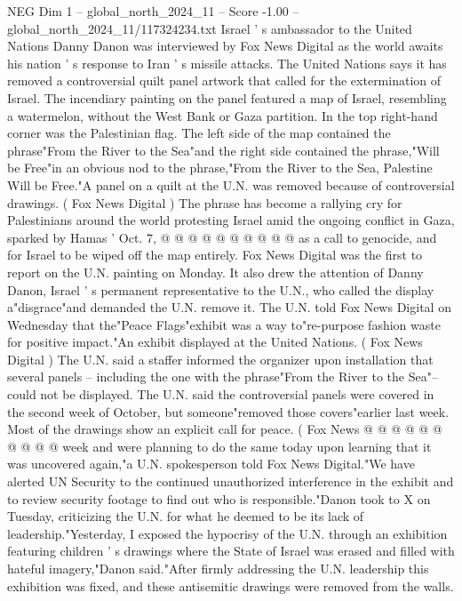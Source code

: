 \begin{textsample}{NEG Dim 1 – global\_north\_2024\_11 – Score -1.00 – global\_north\_2024\_11/117324234.txt}  \label{ex:f1_neg_110}
Israel ' s ambassador to the United Nations Danny Danon was interviewed by Fox News Digital as the world awaits his nation ' s response to Iran ' s missile attacks.
The United Nations says it has removed a controversial quilt panel artwork that called for the extermination of Israel.
The incendiary painting on the panel featured a map of Israel, resembling a watermelon, without the West Bank or Gaza partition.
In the top right-hand corner was the Palestinian flag.
The left side of the map contained the phrase"From the River to the Sea"and the right side contained the phrase,"Will be Free"in an obvious nod to the phrase,"From the River to the Sea, Palestine Will be Free."A panel on a quilt at the U.N. was removed because of controversial drawings. ( Fox News Digital ) The phrase has become a rallying cry for Palestinians around the world protesting Israel amid the ongoing conflict in Gaza, sparked by Hamas ' Oct. 7, @ @ @ @ @ @ @ @ @ @ as a call to genocide, and for Israel to be wiped off the map entirely.
Fox News Digital was the first to report on the U.N. painting on Monday.
It also drew the attention of Danny Danon, Israel ' s permanent representative to the U.N., who called the display a"disgrace"and demanded the U.N. remove it.
The U.N. told Fox News Digital on Wednesday that the"Peace Flags"exhibit was a way to"re-purpose fashion waste for positive impact."An exhibit displayed at the United Nations. ( Fox News Digital ) The U.N. said a staffer informed the organizer upon installation that several panels -- including the one with the phrase"From the River to the Sea"-- could not be displayed.
The U.N. said the controversial panels were covered in the second week of October, but someone"removed those covers"earlier last week.
Most of the drawings show an explicit call for peace. ( Fox News @ @ @ @ @ @ @ @ @ @ week and were planning to do the same today upon learning that it was uncovered again,"a U.N. spokesperson told Fox News Digital."We have alerted UN Security to the continued unauthorized interference in the exhibit and to review security footage to find out who is responsible."Danon took to X on Tuesday, criticizing the U.N. for what he deemed to be its lack of leadership."Yesterday, I exposed the hypocrisy of the U.N. through an exhibition featuring children ' s drawings where the State of Israel was erased and filled with hateful imagery,"Danon said."After firmly addressing the U.N. leadership this exhibition was fixed, and these antisemitic drawings were removed from the walls.

\end{textsample}
